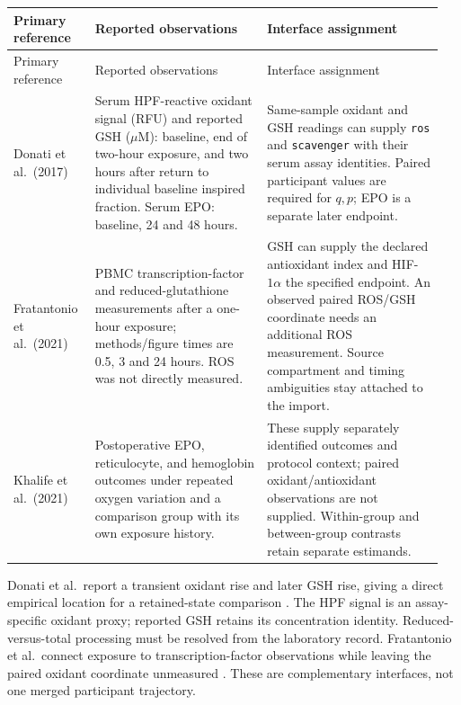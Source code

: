 \documentclass[11pt]{article}
\newcommand{\code}[1]{\nolinkurl{#1}}
\begin{document}
\begin{longtable}{@{}>{\raggedright\arraybackslash}p{0.18\linewidth}>{\raggedright\arraybackslash}p{0.38\linewidth}>{\raggedright\arraybackslash}p{0.39\linewidth}@{}}
\toprule
Primary reference & Reported observations & Interface assignment\\
\midrule
\endfirsthead
\toprule
Primary reference & Reported observations & Interface assignment\\
\midrule
\endhead
Donati et al.\ (2017) \cite{donati}
&
Serum HPF-reactive oxidant signal (RFU) and reported GSH
(\(\mu\mathrm M\)): baseline, end of two-hour exposure, and two hours
after return to individual baseline inspired fraction. Serum EPO:
baseline, 24 and 48 hours.
&
Same-sample oxidant and GSH readings can supply \code{ros} and
\code{scavenger} with their serum assay identities. Paired participant
values are required for \(q,p\); EPO is a separate later endpoint.\\[5pt]
Fratantonio et al.\ (2021) \cite{fratantonio}
&
PBMC transcription-factor and reduced-glutathione measurements after
a one-hour exposure; methods/figure times are 0.5, 3 and 24 hours.
ROS was not directly measured.
&
GSH can supply the declared antioxidant index and HIF-\(1\alpha\)
the specified endpoint. An observed paired ROS/GSH coordinate needs
an additional ROS measurement. Source compartment and timing
ambiguities stay attached to the import.\\[5pt]
Khalife et al.\ (2021) \cite{khalife}
&
Postoperative EPO, reticulocyte, and hemoglobin outcomes under repeated
oxygen variation and a comparison group with its own exposure history.
&
These supply separately identified outcomes and protocol context;
paired oxidant/antioxidant observations are not supplied.
Within-group and between-group contrasts retain separate estimands.\\
\bottomrule
\end{longtable}

Donati et al.\ report a transient oxidant rise and later GSH rise, giving
a direct empirical location for a retained-state comparison \cite{donati}.
The HPF signal is an assay-specific oxidant proxy; reported GSH retains
its concentration identity. Reduced-versus-total processing must be
resolved from the laboratory record. Fratantonio et al.\ connect exposure
to transcription-factor observations while leaving the paired oxidant
coordinate unmeasured \cite{fratantonio}. These are complementary interfaces,
not one merged participant trajectory.
\end{document}
